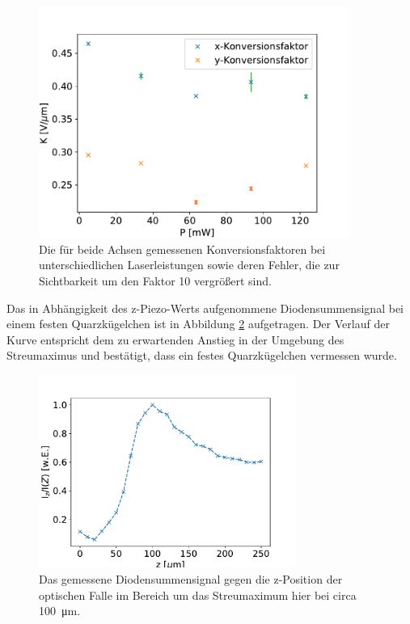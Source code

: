             \begin{figure}[h]
            \centering
            \includegraphics[width = 0.9\textwidth]{Konversion.pdf}
            \caption{Die für beide Achsen gemessenen Konversionsfaktoren bei unterschiedlichen Laserleistungen sowie deren Fehler, die zur Sichtbarkeit um den Faktor 10 vergrößert sind.}
            \label{fig:Konversion}
            \end{figure}
            \FloatBarrier
            \newpage
            Das in Abhängigkeit des z-Piezo-Werts aufgenommene Diodensummensignal bei einem festen Quarzkügelchen ist in Abbildung \ref{fig:Diodensumme} aufgetragen. Der Verlauf der Kurve entspricht dem zu erwartenden Anstieg in der Umgebung des Streumaximus und bestätigt, dass ein festes Quarzkügelchen vermessen wurde.
            \begin{figure}[h]
            \centering
            \includegraphics[width = 0.75\textwidth]{Diodensumme.pdf}
            \caption{Das gemessene Diodensummensignal gegen die z-Position der optischen Falle im Bereich um das Streumaximum hier bei circa \SI{100}{\micro\metre}.}
            \label{fig:Diodensumme}
            \end{figure}
            \FloatBarrier



